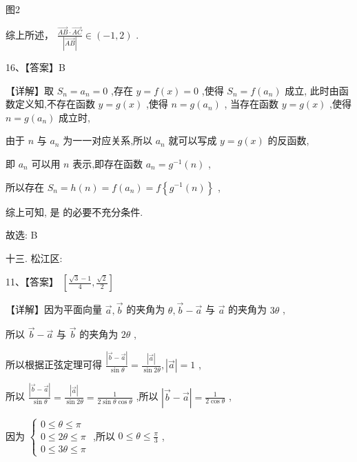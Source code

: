 \documentclass[10pt]{article}
\newcommand*\circled[1]{\tikz[baseline=(char.base)]{\node[shape=circle,draw,inner sep=1.5pt] (char) {\small #1};}}
\begin{document}
图2

综上所述， \(\frac{\overrightarrow{AB} \cdot  \overrightarrow{AC}}{\left| \overrightarrow{AB}\right| } \in  \left( {-1,2}\right)\) .

16、【答案】B

【详解】取 \({S}_{n} = {a}_{n} = 0\) ,存在 \(y = f\left( x\right)  = 0\) ,使得 \({S}_{n} = f\left( {a}_{n}\right)\) 成立, 此时由函数定义知,不存在函数 \(y = g\left( x\right)\) ,使得 \(n = g\left( {a}_{n}\right)\) , 当存在函数 \(y = g\left( x\right)\) ,使得 \(n = g\left( {a}_{n}\right)\) 成立时,

由于 \(n\) 与 \({a}_{n}\) 为一一对应关系,所以 \({a}_{n}\) 就可以写成 \(y = g\left( x\right)\) 的反函数,

即 \({a}_{n}\) 可以用 \(n\) 表示,即存在函数 \({a}_{n} = {g}^{-1}\left( n\right)\) ,

所以存在 \({S}_{n} = h\left( n\right)  = f\left( {a}_{n}\right)  = f\left\{  {{g}^{-1}\left( n\right) }\right\}\) ,

综上可知,  \circled{1} 是 \circled{2} 的必要不充分条件.

故选: B

十三. 松江区:

11、【答案】 \(\left\lbrack  {\frac{\sqrt{3} - 1}{4},\frac{\sqrt{2}}{2}}\right\rbrack\)

【详解】因为平面向量 \(\overrightarrow{a},\overrightarrow{b}\) 的夹角为 \(\theta ,\overrightarrow{b} - \overrightarrow{a}\) 与 \(\overrightarrow{a}\) 的夹角为 \({3\theta }\) ,

所以 \(\overrightarrow{b} - \overrightarrow{a}\) 与 \(\overrightarrow{b}\) 的夹角为 \({2\theta }\) ,

所以根据正弦定理可得 \(\frac{\left| \overrightarrow{b} - \overrightarrow{a}\right| }{\sin \theta } = \frac{\left| \overrightarrow{a}\right| }{\sin {2\theta }},\left| \overrightarrow{a}\right|  = 1\) ,

所以 \(\frac{\left| \overrightarrow{b} - \overrightarrow{a}\right| }{\sin \theta } = \frac{\left| \overrightarrow{a}\right| }{\sin {2\theta }} = \frac{1}{2\sin \theta \cos \theta }\) ,所以 \(\left| {\overrightarrow{b} - \overrightarrow{a}}\right|  = \frac{1}{2\cos \theta }\) ,

因为 \(\left\{  \begin{array}{l} 0 \leq  \theta  \leq  \pi \\  0 \leq  {2\theta } \leq  \pi \\  0 \leq  {3\theta } \leq  \pi  \end{array}\right.\) ,所以 \(0 \leq  \theta  \leq  \frac{\pi }{3}\) ,
\end{document}
